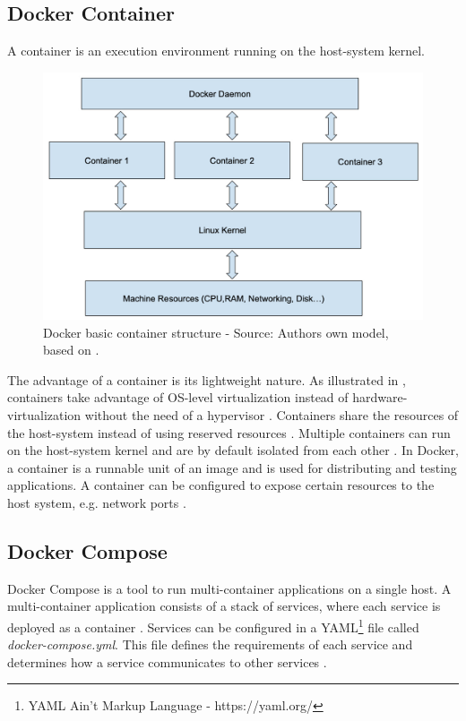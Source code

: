 

\subsection{Docker Container}
A container is an execution environment running on the host-system kernel.

\begin{figure}[h]%
\centering
\includegraphics[scale=0.8]{images/04_technical_background/docker_basic_container_structure}%
\caption{Docker basic container structure - Source: Authors own model, based on \cite{Bullington2020Docker}.}%
\label{fig:docker_container_struct}%
\end{figure}

The advantage of a container is its lightweight nature. As illustrated in , containers take advantage of OS-level virtualization instead of hardware-virtualization without the need of a hypervisor \cite{Docker2020Docs, Nickoloff2019Docker}. Containers share the resources of the host-system instead of using reserved resources \cite{Bullington2020Docker}. Multiple containers can run on the host-system kernel and are by default isolated from each other \cite{Docker2020Docs}.
In Docker, a container is a runnable unit of an image and is used for distributing and testing applications. A container can be configured to expose certain resources to the host system, e.g. network ports \cite{Bullington2020Docker}.


\subsection{Docker Compose}
Docker Compose is a tool to run multi-container applications on a single host. A multi-container application consists of a stack of services, where each service is deployed as a container \cite{Bullington2020Docker, Docker2020Docs}.
Services can be configured in a YAML\footnote{YAML Ain't Markup Language - https://yaml.org/} file called \textit{docker-compose.yml}. This file defines the requirements of each service and determines how a service communicates to other services \cite{Kane2018DockerUp}.


